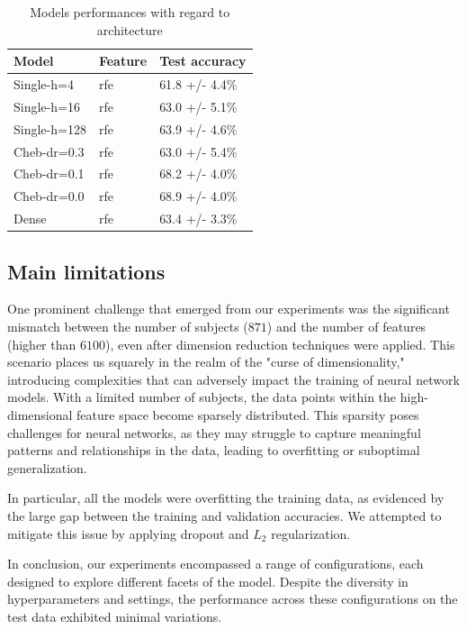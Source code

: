 \begin{table}[H]
	\begin{center}
		\begin{tabular}{lll}
			Model & Feature & Test accuracy \\
			\hline
			Single-h=4 & rfe & 61.8 +/- 4.4\% \\
			Single-h=16 & rfe & 63.0 +/- 5.1\% \\
			Single-h=128 & rfe & 63.9 +/- 4.6\% \\
			Cheb-dr=0.3 & rfe & 63.0 +/- 5.4\% \\
			Cheb-dr=0.1 & rfe & 68.2 +/- 4.0\% \\
			Cheb-dr=0.0 & rfe & 68.9 +/- 4.0\% \\
			Dense & rfe & 63.4 +/- 3.3\% \\
		\end{tabular}
	\end{center}
	\caption{Models performances with regard to architecture}
	\label{table:dependance_on_architecture}
\end{table}




\subsection{Main limitations}


One prominent challenge that emerged from our experiments was the significant mismatch between the number of subjects ($871$) and the number of features (higher than $6100$), even after dimension reduction techniques were applied. This scenario places us squarely in the realm of the "curse of dimensionality," introducing complexities that can adversely impact the training of neural network models. With a limited number of subjects, the data points within the high-dimensional feature space become sparsely distributed. This sparsity poses challenges for neural networks, as they may struggle to capture meaningful patterns and relationships in the data, leading to overfitting or suboptimal generalization.

In particular, all the models were overfitting the training data, as evidenced by the large gap between the training and validation accuracies. We attempted to mitigate this issue by applying dropout and $L_2$ regularization. 

In conclusion, our experiments encompassed a range of configurations, each designed to explore different facets of the model. Despite the diversity in hyperparameters and settings, the performance across these configurations on the test data exhibited minimal variations.